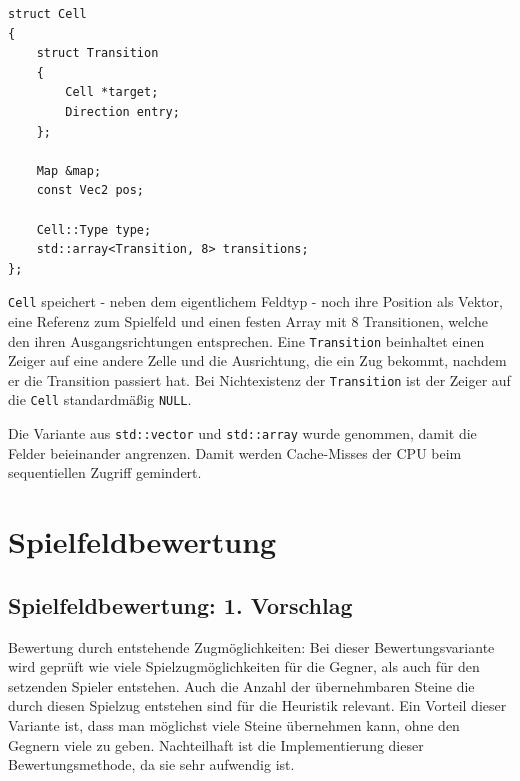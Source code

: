 \documentclass[12pt,a4paper]{article}
\begin{document}
\begin{lstlisting}[caption=\texttt{Cell} Struktur, label=lst:cell-struct]
struct Cell
{
	struct Transition
	{
		Cell *target;
		Direction entry;
	};
	
	Map &map;
	const Vec2 pos;
	
	Cell::Type type;
	std::array<Transition, 8> transitions;
};
\end{lstlisting}


\texttt{Cell} speichert - neben dem eigentlichem Feldtyp - noch ihre Position als Vektor, eine Referenz zum Spielfeld und einen festen Array mit 8 Transitionen, welche den ihren Ausgangsrichtungen entsprechen.
Eine \texttt{Transition} beinhaltet einen Zeiger auf eine andere Zelle und die Ausrichtung, die ein Zug bekommt, nachdem er die Transition passiert hat.
Bei Nichtexistenz der \texttt{Transition} ist der Zeiger auf die \texttt{Cell} standardmäßig \texttt{NULL}.

Die Variante aus \texttt{std::vector} und \texttt{std::array} wurde genommen, damit die Felder beieinander angrenzen. Damit werden Cache-Misses der CPU beim sequentiellen Zugriff gemindert.




\newpage
\section{Spielfeldbewertung}
\subsection{Spielfeldbewertung: 1. Vorschlag}
Bewertung durch entstehende Zugmöglichkeiten:\newline
Bei dieser Bewertungsvariante wird geprüft wie viele Spielzugmöglichkeiten für die Gegner, als auch für den setzenden Spieler entstehen. Auch die Anzahl der übernehmbaren Steine die durch diesen Spielzug entstehen sind für die Heuristik relevant.\newline
Ein Vorteil dieser Variante ist, dass man möglichst viele Steine übernehmen kann, ohne den Gegnern viele zu geben.\newline
Nachteilhaft ist die Implementierung dieser Bewertungsmethode, da sie sehr aufwendig ist.
\end{document}

